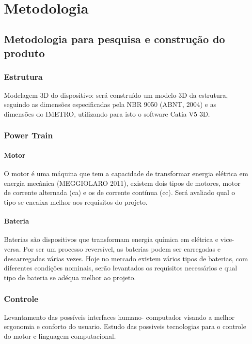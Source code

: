 \chapter[Metodologia]{Metodologia}

\section{Metodologia para pesquisa e construção do produto}

\subsection{Estrutura}
Modelagem 3D do dispositivo: será construído um modelo 3D da estrutura, seguindo as dimensões especificadas pela NBR 9050 (ABNT, 2004) e as dimensões do IMETRO, utilizando para isto o software Catia V5 3D.

\subsection{Power Train}

\subsubsection{Motor}
O motor é uma máquina que tem a capacidade de transformar energia elétrica em energia mecânica (MEGGIOLARO 2011), existem dois tipos de motores, motor de corrente alternada (ca) e os de corrente contínua (cc). Será avaliado qual o tipo se encaixa melhor aos requisitos do projeto.

\subsubsection{Bateria}
Baterias são dispositivos que transformam energia química em elétrica e vice-versa. Por ser um processo reversível, as baterias podem ser carregadas e descarregadas várias vezes. Hoje no mercado existem vários tipos de baterias, com diferentes condições nominais, serão levantados os requisitos necessários e qual tipo de bateria se adéqua melhor ao projeto.

\subsection{Controle}
Levantamento das possíveis interfaces humano- computador visando a melhor ergonomia e conforto do usuario. Estudo das possiveis tecnologias para o controle do motor e linguagem computacional.

